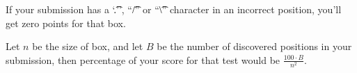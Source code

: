 If your submission has a `\t{.}'', ``\t{/}'' or ``\t{\textbackslash}'' character in an incorrect position, you'll get zero points for that box.

Let $n$ be the size of box, and let $B$ be the number of discovered positions in your submission, then percentage of your score for that test would be
$\frac{100 \cdot B}{n^2}$.
